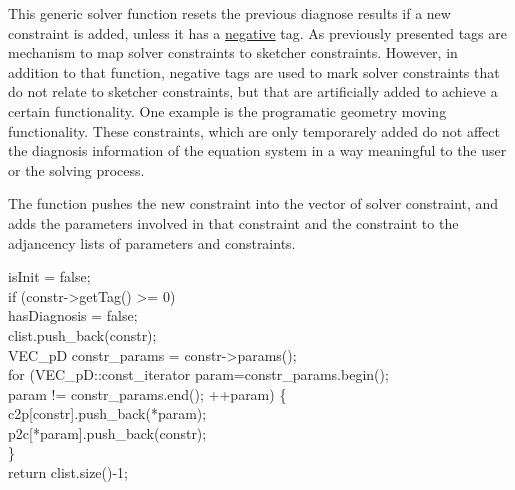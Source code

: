 \documentclass[12pt,twoside,a4paper]{book}
\begin{document}
    This generic solver function resets the previous diagnose results if a new constraint is added, unless it has a \underline{negative} tag. As previously presented tags are mechanism to map solver constraints to sketcher constraints. However, in addition to that function, negative tags are used to mark solver constraints that do not relate to sketcher constraints, but that are artificially added to achieve a certain functionality. One example is the programatic geometry moving functionality. These constraints, which are only temporarely added do not affect the diagnosis information of the equation system in a way meaningful to the user or the solving process.

    The function pushes the new constraint into the vector of solver constraint, and adds the parameters involved in that constraint and the constraint to the adjancency lists of parameters and constraints.

    \begin{codequote}
    isInit = false;\\
    if (constr-\textgreater{}getTag() \textgreater= 0)\\
    \-\hspace{0.75cm}hasDiagnosis = false;\\

    clist.push\_back(constr);\\
    VEC\_pD constr\_params = constr-\textgreater{}params();\\

    for (VEC\_pD::const\_iterator param=constr\_params.begin();\\
    \-\hspace{0.5cm}param != constr\_params.end(); ++param) \{\\
    \-\hspace{0.75cm}c2p[constr].push\_back(*param);\\
    \-\hspace{0.75cm}p2c[*param].push\_back(constr);\\
    \}\\
    return clist.size()-1;
    \end{codequote}
\end{document}
